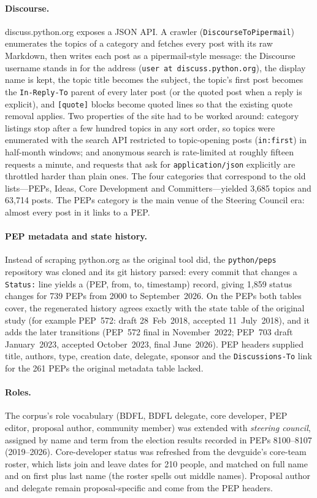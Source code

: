 \documentclass[sigconf,screen]{acmart}
\begin{document}
\paragraph{Discourse.} discuss.python.org exposes a JSON API. A crawler (\texttt{DiscourseToPipermail}) enumerates the topics of a category and fetches every post with its raw Markdown, then writes each post as a pipermail-style message: the Discourse username stands in for the address (\texttt{user at discuss.python.org}), the display name is kept, the topic title becomes the subject, the topic's first post becomes the \texttt{In-Reply-To} parent of every later post (or the quoted post when a reply is explicit), and \texttt{[quote]} blocks become quoted lines so that the existing quote removal applies. Two properties of the site had to be worked around: category listings stop after a few hundred topics in any sort order, so topics were enumerated with the search API restricted to topic-opening posts (\texttt{in:first}) in half-month windows; and anonymous search is rate-limited at roughly fifteen requests a minute, and requests that ask for \texttt{application/json} explicitly are throttled harder than plain ones. The four categories that correspond to the old lists---PEPs, Ideas, Core Development and Committers---yielded 3,685 topics and 63,714 posts. The PEPs category is the main venue of the Steering Council era: almost every post in it links to a PEP.

\paragraph{PEP metadata and state history.} Instead of scraping python.org as the original tool did, the \texttt{python/peps} repository was cloned and its git history parsed: every commit that changes a \texttt{Status:} line yields a (PEP, from, to, timestamp) record, giving 1,859 status changes for 739 PEPs from 2000 to September~2026. On the PEPs both tables cover, the regenerated history agrees exactly with the state table of the original study (for example PEP~572: draft 28~Feb~2018, accepted 11~July~2018), and it adds the later transitions (PEP~572 final in November~2022; PEP~703 draft January~2023, accepted October~2023, final June~2026). PEP headers supplied title, authors, type, creation date, delegate, sponsor and the \texttt{Discussions-To} link for the 261 PEPs the original metadata table lacked.

\paragraph{Roles.} The corpus's role vocabulary (BDFL, BDFL delegate, core developer, PEP editor, proposal author, community member) was extended with \emph{steering council}, assigned by name and term from the election results recorded in PEPs 8100--8107 (2019--2026). Core-developer status was refreshed from the devguide's core-team roster, which lists join and leave dates for 210 people, and matched on full name and on first plus last name (the roster spells out middle names). Proposal author and delegate remain proposal-specific and come from the PEP headers.
\end{document}
